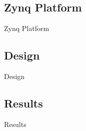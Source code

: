 \subsection{Zynq Platform}
\begin{frame}[label=zynq]{Zynq Platform}
\end{frame}

\subsection{Design}
\begin{frame}[label=design]{Design}
\end{frame}

\subsection{Results}
\begin{frame}[label=results]{Results}
\end{frame}